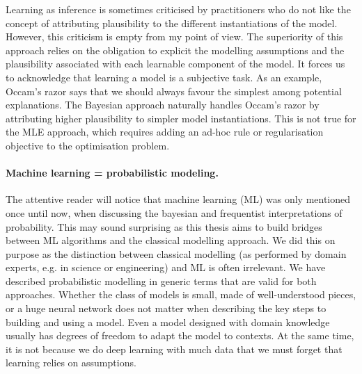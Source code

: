 Learning as inference is sometimes criticised by practitioners who do not like the concept of attributing plausibility to the different instantiations of the model. However, this criticism is empty from my point of view. The superiority of this approach relies on the obligation to explicit the modelling assumptions and the plausibility associated with each learnable component of the model. It forces us to acknowledge that learning a model is a subjective task. As an example, Occam's razor says that we should always favour the simplest among potential explanations. The Bayesian approach naturally handles Occam's razor by attributing higher plausibility to simpler model instantiations. This is not true for the MLE approach, which requires adding an ad-hoc rule or regularisation objective to the optimisation problem.

%
\paragraph{Machine learning = probabilistic modeling.}
The attentive reader will notice that machine learning (ML) was only mentioned once until now, when discussing the bayesian and frequentist interpretations of probability.
This may sound surprising as this thesis aims to build bridges between ML algorithms and the classical modelling approach. We did this on purpose as the distinction between classical modelling (as performed by domain experts, e.g. in science or engineering) and ML is often irrelevant. We have described probabilistic modelling in generic terms that are valid for both approaches. Whether the class of models is small, made of well-understood pieces, or a huge neural network does not matter when describing the key steps to building and using a model. Even a model designed with domain knowledge usually has degrees of freedom to adapt the model to contexts. At the same time, it is not because we do deep learning with much data that we must forget that learning relies on assumptions.

